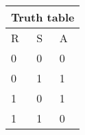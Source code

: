 \begin{tabular}{|p{2cm}|p{2cm}|p{2cm}|}
\hline
\multicolumn{3}{|c|}{Truth table}\\
\hline
R& S& A\\
\hline
0& 0& 0\\
\hline
0& 1& 1\\
\hline
1& 0& 1\\
\hline
1& 1& 0\\
\hline
\end{tabular}
